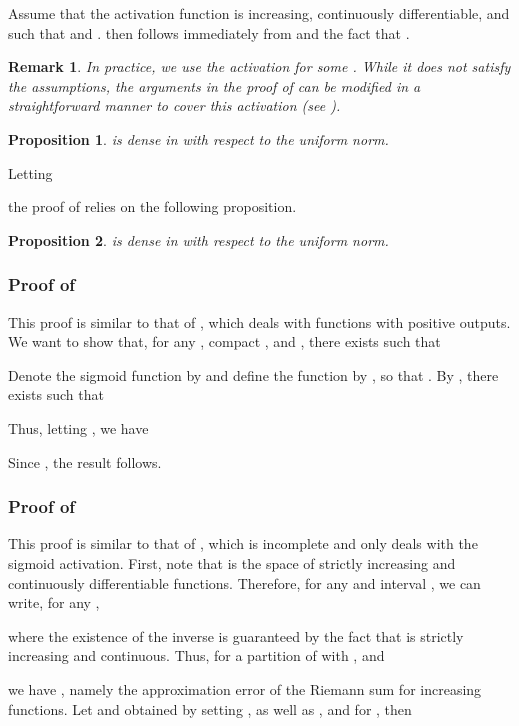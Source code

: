 \documentclass{article}
\newtheorem{proposition}{Proposition}
\newtheorem{remark}{Remark}\clearpage{}
\begin{document}
Assume that the activation function  is increasing, continuously differentiable, and such that  and .
 then follows immediately from  and the fact that .
\begin{remark}
    In practice, we use the activation  for some .
    While it does not satisfy the assumptions, the arguments in the proof of  can be modified in a straightforward manner to cover this activation (see ).
\end{remark}
\begin{proposition}\label{prop:universal_1a}
 is dense in  with respect to the uniform norm.
\end{proposition}
Letting

the proof of  relies on the following proposition.
\begin{proposition}\label{prop:universal_1b}
 is dense in  with respect to the uniform norm.
\end{proposition}


\subsubsection{Proof of }
This proof is similar to that of \cite[][Theorem 2]{dugas2009incorporating}, which deals with functions with positive outputs.
We want to show that, for any , compact , and , there exists  such that


Denote the sigmoid function by  and define the function  by , so that .
By ,
there exists  such that

Thus, letting , we have

Since , the result follows.

\subsubsection{Proof of }
This proof is similar to that of \cite[][Theorem 3.1]{Daniels2010}, which is incomplete and only deals with the sigmoid activation.
First, note that  is the space of strictly increasing and continuously differentiable functions.
Therefore, for any  and interval , we can write, for any ,

where the existence of the inverse  is guaranteed by the fact that  is strictly increasing and continuous.
Thus, for  a partition of  with ,  and

we have , namely the approximation error of the Riemann sum for increasing functions.
Let  and  obtained by setting , as well as ,  and  for , then
\end{document}
